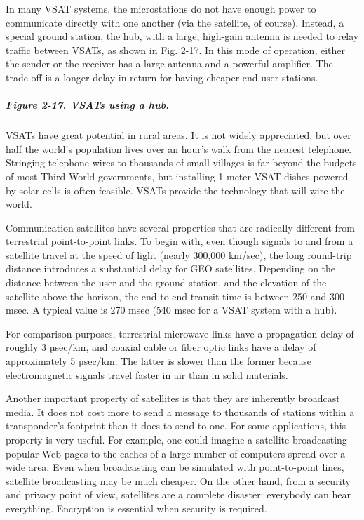 In many VSAT systems, the microstations do not have enough power to
communicate directly with one another (via the satellite, of course).
Instead, a special ground station, the {hub}, with a large, high-gain
antenna is needed to relay traffic between VSATs, as shown in
\protect\hyperlink{0130661023_ch02lev1sec4.htmlux5cux23ch02fig17}{Fig.
2-17}. In this mode of operation, either the sender or the receiver has
a large antenna and a powerful amplifier. The trade-off is a longer
delay in return for having cheaper end-user stations.

\subparagraph[Figure 2-17. VSATs using a
hub.]{\texorpdfstring{\protect\hypertarget{0130661023_ch02lev1sec4.htmlux5cux23ch02fig17}{}{}Figure
2-17. VSATs using a hub.}{Figure 2-17. VSATs using a hub.}}


VSATs have great potential in rural areas. It is not widely appreciated,
but over half the world's population lives over an hour's walk from the
nearest telephone. Stringing telephone wires to thousands of small
villages is far beyond the budgets of most Third World governments, but
installing 1-meter VSAT dishes powered by solar cells is often feasible.
VSATs provide the technology that will wire the world.

Communication satellites have several properties that are radically
different from terrestrial point-to-point links. To begin with, even
though signals to and from a satellite travel at the speed of light
(nearly 300,000 km/sec), the long round-trip distance introduces a
substantial delay for GEO satellites. Depending on the distance between
the user and the ground station, and the elevation of the satellite
above the horizon, the end-to-end transit time is between 250 and 300
msec. A typical value is 270 msec (540 msec for a VSAT system with a
hub).

For comparison purposes, terrestrial microwave links have a propagation
delay of roughly 3 µsec/km, and coaxial cable or fiber optic links have
a delay of approximately 5 µsec/km. The latter is slower than the former
because electromagnetic signals travel faster in air than in solid
materials.

Another important property of satellites is that they are inherently
broadcast media. It does not cost more to send a message to thousands of
stations within a transponder's footprint than it does to send to one.
For some applications, this property is very useful. For example, one
could imagine a satellite broadcasting popular Web pages to the caches
of a large number of computers spread over a wide area. Even when
broadcasting can be simulated with point-to-point lines, satellite
broadcasting may be much cheaper. On the other hand, from a security and
privacy point of view, satellites are a complete disaster: everybody can
hear everything. Encryption is essential when security is required.

